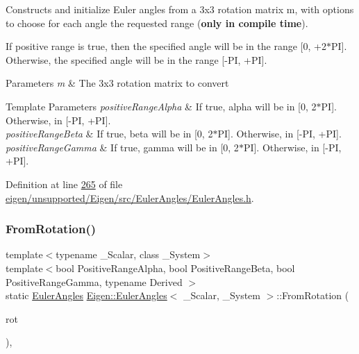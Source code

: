 Constructs and initialize Euler angles from a 3x3 rotation matrix {\ttfamily m}, with options to choose for each angle the requested range ({\bfseries only in compile time}).

If positive range is true, then the specified angle will be in the range \mbox{[}0, +2$\ast$\+PI\mbox{]}. Otherwise, the specified angle will be in the range \mbox{[}-\/\+PI, +\+PI\mbox{]}.


\begin{DoxyParams}{Parameters}
{\em m} & The 3x3 rotation matrix to convert \\
\hline
\end{DoxyParams}

\begin{DoxyTemplParams}{Template Parameters}
{\em positive\+Range\+Alpha} & If true, alpha will be in \mbox{[}0, 2$\ast$\+PI\mbox{]}. Otherwise, in \mbox{[}-\/\+PI, +\+PI\mbox{]}. \\
\hline
{\em positive\+Range\+Beta} & If true, beta will be in \mbox{[}0, 2$\ast$\+PI\mbox{]}. Otherwise, in \mbox{[}-\/\+PI, +\+PI\mbox{]}. \\
\hline
{\em positive\+Range\+Gamma} & If true, gamma will be in \mbox{[}0, 2$\ast$\+PI\mbox{]}. Otherwise, in \mbox{[}-\/\+PI, +\+PI\mbox{]}. \\
\hline
\end{DoxyTemplParams}


Definition at line \hyperlink{eigen_2unsupported_2_eigen_2src_2_euler_angles_2_euler_angles_8h_source_l00265}{265} of file \hyperlink{eigen_2unsupported_2_eigen_2src_2_euler_angles_2_euler_angles_8h_source}{eigen/unsupported/\+Eigen/src/\+Euler\+Angles/\+Euler\+Angles.\+h}.

\mbox{\label{class_eigen_1_1_euler_angles_aec5a08ed94b3574402d99850d766d18a}} 
\subsubsection{\texorpdfstring{From\+Rotation()}{FromRotation()}\hspace{0.1cm}{\footnotesize\ttfamily [3/4]}}
{\footnotesize\ttfamily template$<$typename \+\_\+\+Scalar, class \+\_\+\+System$>$ \\
template$<$bool Positive\+Range\+Alpha, bool Positive\+Range\+Beta, bool Positive\+Range\+Gamma, typename Derived $>$ \\
static \hyperlink{class_eigen_1_1_euler_angles}{Euler\+Angles} \hyperlink{class_eigen_1_1_euler_angles}{Eigen\+::\+Euler\+Angles}$<$ \+\_\+\+Scalar, \+\_\+\+System $>$\+::From\+Rotation (\begin{DoxyParamCaption}\item[{const \hyperlink{class_eigen_1_1_rotation_base}{Rotation\+Base}$<$ Derived, 3 $>$ \&}]{rot }\end{DoxyParamCaption})\hspace{0.3cm}{\ttfamily [inline]}, {\ttfamily [static]}}

